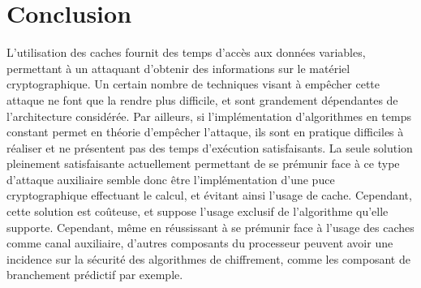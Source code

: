 \documentclass[a4paper,11pt]{article}
\begin{document}
\section*{Conclusion}
L'utilisation des caches fournit des temps d'accès aux données variables, permettant à un attaquant d'obtenir des informations sur le matériel cryptographique. Un certain nombre de techniques visant à empêcher cette attaque ne font que la rendre plus difficile, et sont grandement dépendantes de l'architecture considérée. Par ailleurs, si l'implémentation d'algorithmes en temps constant permet en théorie d'empêcher l'attaque, ils sont en pratique difficiles à réaliser et ne présentent pas des temps d'exécution satisfaisants. La seule solution pleinement satisfaisante actuellement permettant de se prémunir face à ce type d'attaque auxiliaire semble donc être l'implémentation d'une puce cryptographique effectuant le calcul, et évitant ainsi l'usage de cache. Cependant, cette solution est coûteuse, et suppose l'usage exclusif de l'algorithme qu'elle supporte. 
Cependant, même en réussissant à se prémunir face à l'usage des caches comme canal auxiliaire, d'autres composants du processeur peuvent avoir une incidence sur la sécurité des algorithmes de chiffrement, comme les composant de branchement prédictif par exemple.

\newpage
\nocite{*}


\end{document}
